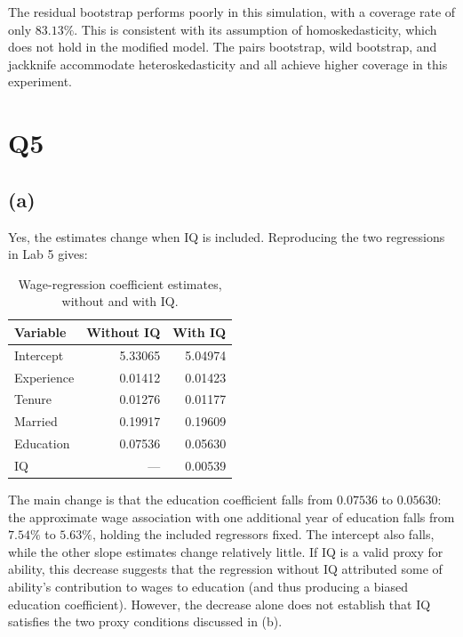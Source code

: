 \documentclass[11pt]{article}
\begin{document}
The residual bootstrap performs poorly in this simulation, with a
coverage rate of only $83.13\%$. This is consistent with its assumption
of homoskedasticity, which does not hold in the modified model. The
pairs bootstrap, wild bootstrap, and jackknife accommodate
heteroskedasticity and all achieve higher coverage in this experiment.

\clearpage
\section{Q5}
\label{sec:q5}
\subsection{(a)}
Yes, the estimates change when IQ is included. Reproducing the two
regressions in Lab 5 gives:
\begin{table}[htbp]
\centering
\caption{Wage-regression coefficient estimates, without and with IQ.}
\label{tab:q5-proxy}
\begin{tabular}{lrr}
\toprule
Variable & Without IQ & With IQ \\
\midrule
Intercept & 5.33065 & 5.04974 \\
Experience & 0.01412 & 0.01423 \\
Tenure & 0.01276 & 0.01177 \\
Married & 0.19917 & 0.19609 \\
Education & 0.07536 & 0.05630 \\
IQ & --- & 0.00539 \\
\bottomrule
\end{tabular}
\end{table}

The main change is that the education coefficient falls from $0.07536$
to $0.05630$: the approximate wage association with one additional year
of education falls from $7.54\%$ to $5.63\%$, holding the included
regressors fixed. The intercept also falls, while the other slope
estimates change relatively little. If IQ is a valid proxy for ability,
this decrease suggests that the regression without IQ attributed some
of ability's contribution to wages to education (and thus producing a biased education coefficient). However, the decrease
alone does not establish that IQ satisfies the two proxy conditions discussed
in (b).
\end{document}
